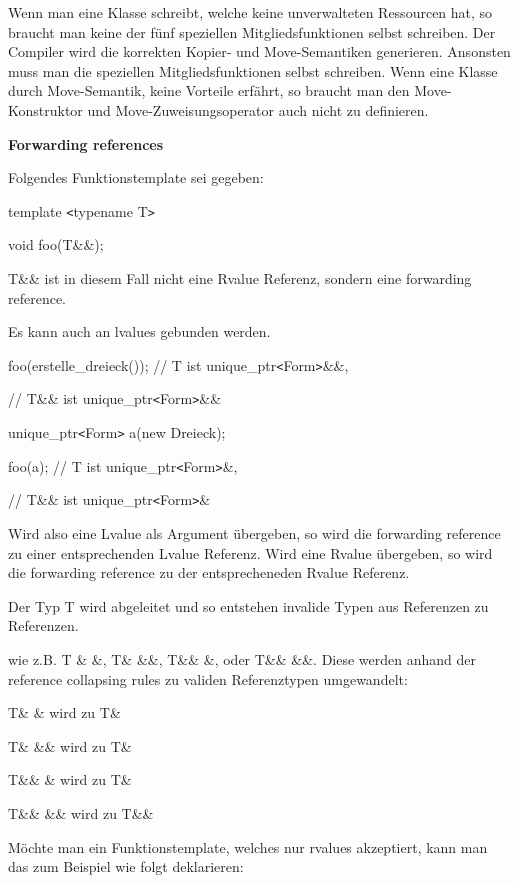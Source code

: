 \documentclass{article}
\begin{document}
Wenn man eine Klasse schreibt, welche keine unverwalteten Ressourcen hat, so braucht 
man keine der fünf speziellen Mitgliedsfunktionen selbst schreiben. Der Compiler 
wird die korrekten Kopier- und Move-Semantiken generieren. Ansonsten muss man die 
speziellen Mitgliedsfunktionen selbst schreiben. Wenn eine Klasse durch Move-Semantik, 
keine Vorteile erfährt, so braucht man den Move-Konstruktor und Move-Zuweisungsoperator 
auch nicht zu definieren.

\vspace{12pt}
\textbf{Forwarding references}

Folgendes Funktionstemplate sei gegeben:

template \texttt{<}typename T\texttt{>}

void foo(T\&\&);

T\&\& ist in diesem Fall nicht eine Rvalue Referenz, sondern eine forwarding reference.

Es kann auch an lvalues gebunden werden.

foo(erstelle\_dreieck()); // T ist unique\_ptr\texttt{<}Form\texttt{>}\&\&,    
                     

\parindent=90pt
// T\&\& ist unique\_ptr\texttt{<}Form\texttt{>}\&\&

\parindent=0pt
unique\_ptr\texttt{<}Form\texttt{>} a(new Dreieck);

foo(a); // T ist unique\_ptr\texttt{<}Form\texttt{>}\&,        

\parindent=28pt
// T\&\& ist unique\_ptr\texttt{<}Form\texttt{>}\&

\parindent=0pt
Wird also eine Lvalue als Argument übergeben, so wird die forwarding reference 
zu einer entsprechenden Lvalue Referenz. Wird eine Rvalue übergeben, so wird die 
forwarding reference zu der entsprecheneden Rvalue Referenz.

Der Typ T wird abgeleitet und so entstehen invalide Typen aus Referenzen zu Referenzen.

wie z.B. T \& \&, T\& \&\&, T\&\& \&, oder T\&\& \&\&. Diese werden anhand der 
reference collapsing rules zu validen Referenztypen umgewandelt:

T\& \& wird zu T\&

T\& \&\& wird zu T\&

T\&\& \& wird zu T\&

T\&\& \&\& wird zu T\&\&

\vspace{12pt}
Möchte man ein Funktionstemplate, welches nur rvalues akzeptiert, kann man das 
zum Beispiel wie folgt deklarieren:
\end{document}
